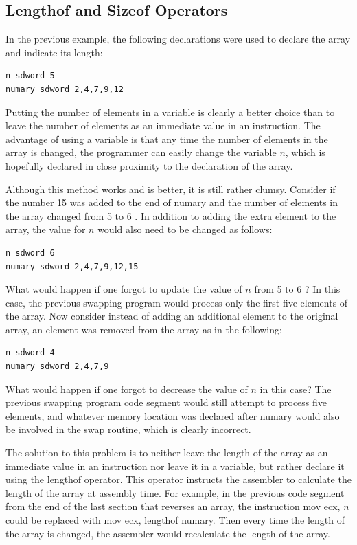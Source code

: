 \documentclass[10pt]{book}
\begin{document}
\subsection{Lengthof and Sizeof Operators}
In the previous example, the following declarations were used to declare the array and indicate its length:

\begin{verbatim}
n sdword 5
numary sdword 2,4,7,9,12
\end{verbatim}

Putting the number of elements in a variable is clearly a better choice than to leave the number of elements as an immediate value in an instruction. The advantage of using a variable is that any time the number of elements in the array is changed, the programmer can easily change the variable $n$, which is hopefully declared in close proximity to the declaration of the array.

Although this method works and is better, it is still rather clumsy. Consider if the number 15 was added to the end of numary and the number of elements in the array changed from 5 to 6 . In addition to adding the extra element to the array, the value for $n$ would also need to be changed as follows:


\begin{verbatim}
n sdword 6
numary sdword 2,4,7,9,12,15
\end{verbatim}

What would happen if one forgot to update the value of $n$ from 5 to 6 ? In this case, the previous swapping program would process only the first five elements of the array. Now consider instead of adding an additional element to the original array, an element was removed from the array as in the following:

\begin{verbatim}
n sdword 4
numary sdword 2,4,7,9
\end{verbatim}

What would happen if one forgot to decrease the value of $n$ in this case? The previous swapping program code segment would still attempt to process five elements, and whatever memory location was declared after numary would also be involved in the swap routine, which is clearly incorrect.

The solution to this problem is to neither leave the length of the array as an immediate value in an instruction nor leave it in a variable, but rather declare it using the lengthof operator. This operator instructs the assembler to calculate the length of the array at assembly time. For example, in the previous code segment from the end of the last section that reverses an array, the instruction mov ecx, $n$ could be replaced with mov ecx, lengthof numary. Then every time the length of the array is changed, the assembler would recalculate the length of the array.
\end{document}
